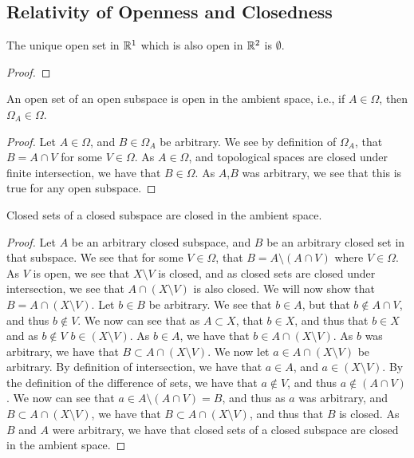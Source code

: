 \subsection{Relativity of Openness and Closedness}
\begin{majorEx}%
The unique open set in $\mathbb{R}^1$ which is also open in $\mathbb{R}^2$ is $\emptyset$.
\end{majorEx}
\begin{proof}
\end{proof}

\begin{majorEx}%
An open set of an open subspace is open in the ambient space, i.e., if $A \in \Omega$, then $\Omega_A \in \Omega$.
\end{majorEx}
\begin{proof}
  Let $A\in \Omega$, and $B \in \Omega_A$ be arbitrary. We see by
  definition of 
  $\Omega_A$, that $B = A \cap V$ for some $V\in \Omega$. As $A\in
  \Omega$, and topological spaces are closed under finite
  intersection, we have that $B \in \Omega$. As $A$,$B$ was arbitrary, we
  see that this is true for any open subspace.
\end{proof}

\begin{majorEx}%
Closed sets of a closed subspace are closed in the ambient space.
\end{majorEx}
\begin{proof}
  Let $A$ be an arbitrary closed subspace, and $B$ be an arbitrary
  closed set in that subspace. We see that for some $V\in \Omega$,
  that $B= A \setminus (A\cap V)$ where $V \in \Omega$. As $V$ is
  open, we see that $X \setminus V$ is closed, and as closed sets are
  closed under intersection, we see that $A \cap (X \setminus V)$ is
  also closed. We will now show that $B =A \cap (X \setminus V)$. Let
  $b\in B$ be arbitrary. We see that $b\in A$, but that $b \notin
  A \cap V$, and thus $b \notin V$. We now can see that as $A\subset
  X$, that $b\in X$, and thus that $b\in X$ and as $b\notin V$ $b\in
  (X\setminus V)$. As $b \in A$, we have that $b\in A \cap (X\setminus
  V)$. As $b$ was arbitrary, we have that $B \subset A \cap (X \setminus V)$.
  We now let  $a\in A \cap (X \setminus V)$ be arbitrary. By
  definition of intersection, we have that $a \in A$, and 
  $a \in  (X \setminus V)$. By the definition of the difference of
  sets, we have that $a \notin V$, and thus  $a \notin (A\cap V)$. We
  now can see that $a \in A \setminus (A\cap V) = B$, and thus as $a$
  was arbitrary, and $B \subset A \cap (X \setminus V)$, we have that
  $B \subset A \cap (X \setminus V)$, and thus that $B$ is closed. As
  $B$ and $A$ were arbitrary, we have that closed sets of a closed
  subspace are closed in the ambient space. 
\end{proof}

